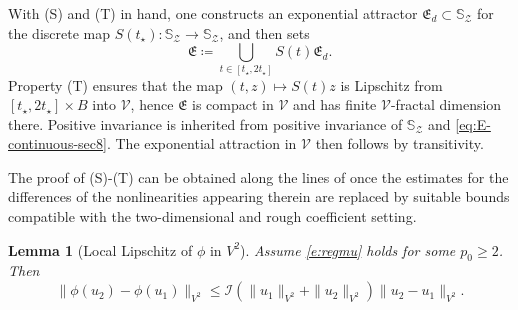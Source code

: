 \documentclass[12pt,leqno]{amsart}
\newtheorem{lemma}[theorem]{Lemma}
\theoremstyle{definition}
\numberwithin{equation}{section}
\numberwithin{figure}{section}
\begin{document}
With (S) and (T) in hand,  one constructs an exponential attractor $\mathfrak E_d\subset  \mathbb S_{\mathcal Z}$ for the discrete map
$S(t_\star): \mathbb S_{\mathcal Z}\to  \mathbb S_{\mathcal Z}$, and then sets
\begin{equation}\label{eq:E-continuous-sec8}
\mathfrak E\coloneqq \bigcup_{t\in[t_\star,2t_\star]} S(t)\mathfrak E_d.
\end{equation}
Property (T) ensures that the map $(t,z)\mapsto S(t)z$ is Lipschitz from
$[t_\star,2t_\star]\times B$ into $\mathcal V$, hence $\mathfrak E$ is compact in $\mathcal V$
and has finite $\mathcal V$-fractal dimension there. Positive invariance is inherited from  positive invariance of $  \mathbb S_{\mathcal Z}$
and \eqref{eq:E-continuous-sec8}. The exponential attraction in $\mathcal V$ then follows by transitivity.

The proof of (S)-(T) can be obtained along the lines of \cite[\S8]{CGDP2010} once  the estimates for the differences of the   nonlinearities appearing therein are replaced by suitable bounds compatible with the two-dimensional and rough coefficient setting.
 
\begin{lemma}[Local Lipschitz of $\phi$ in ${V^2}$]\label{lem:phi-lip-H2}
Assume   \eqref{e:regmu} holds for some $p_0 \geq 2$. Then 
\begin{equation}\label{eq:phi-lip-H2}
\|\phi(u_2)-\phi(u_1)\|_{{V^2}}\le \mathcal I(\|u_1\|_{{V^2}}+ \|u_2\|_{{V^2}}) \|u_2-u_1\|_{{V^2}}.
\end{equation}
\end{lemma}
\end{document}
